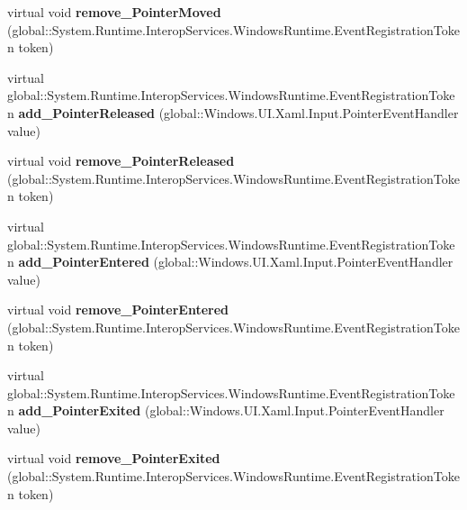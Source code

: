 \begin{DoxyCompactItemize}
virtual void {\bfseries remove\+\_\+\+Pointer\+Moved} (global\+::\+System.\+Runtime.\+Interop\+Services.\+Windows\+Runtime.\+Event\+Registration\+Token token)
\item 
\mbox{\label{class_windows_1_1_u_i_1_1_xaml_1_1_u_i_element_ac262b01e4394eafebb2fc7c72a05c364}} 
virtual global\+::\+System.\+Runtime.\+Interop\+Services.\+Windows\+Runtime.\+Event\+Registration\+Token {\bfseries add\+\_\+\+Pointer\+Released} (global\+::\+Windows.\+U\+I.\+Xaml.\+Input.\+Pointer\+Event\+Handler value)
\item 
\mbox{\label{class_windows_1_1_u_i_1_1_xaml_1_1_u_i_element_a6b1fe59db3a3dade2439c90e7005d059}} 
virtual void {\bfseries remove\+\_\+\+Pointer\+Released} (global\+::\+System.\+Runtime.\+Interop\+Services.\+Windows\+Runtime.\+Event\+Registration\+Token token)
\item 
\mbox{\label{class_windows_1_1_u_i_1_1_xaml_1_1_u_i_element_a62b58e40180ca9bf1db42ed2d6038c28}} 
virtual global\+::\+System.\+Runtime.\+Interop\+Services.\+Windows\+Runtime.\+Event\+Registration\+Token {\bfseries add\+\_\+\+Pointer\+Entered} (global\+::\+Windows.\+U\+I.\+Xaml.\+Input.\+Pointer\+Event\+Handler value)
\item 
\mbox{\label{class_windows_1_1_u_i_1_1_xaml_1_1_u_i_element_a7f81753f2c0c006e2fa7fc60206ef8fe}} 
virtual void {\bfseries remove\+\_\+\+Pointer\+Entered} (global\+::\+System.\+Runtime.\+Interop\+Services.\+Windows\+Runtime.\+Event\+Registration\+Token token)
\item 
\mbox{\label{class_windows_1_1_u_i_1_1_xaml_1_1_u_i_element_add2a4b911cb6783842ef779b81b58824}} 
virtual global\+::\+System.\+Runtime.\+Interop\+Services.\+Windows\+Runtime.\+Event\+Registration\+Token {\bfseries add\+\_\+\+Pointer\+Exited} (global\+::\+Windows.\+U\+I.\+Xaml.\+Input.\+Pointer\+Event\+Handler value)
\item 
\mbox{\label{class_windows_1_1_u_i_1_1_xaml_1_1_u_i_element_a0371add03a51f168e0d1456bdb3c1130}} 
virtual void {\bfseries remove\+\_\+\+Pointer\+Exited} (global\+::\+System.\+Runtime.\+Interop\+Services.\+Windows\+Runtime.\+Event\+Registration\+Token token)

\end{DoxyCompactItemize}
